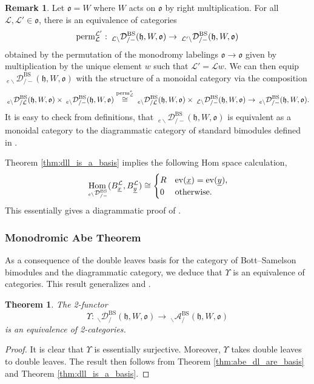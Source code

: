 \documentclass{amsart}
\newcommand{\scrL}{\mathcal{L}}
\DeclareMathOperator{\Hom}{Hom}
\newcommand{\fr}[1]{\mathfrak{#1}}
\DeclareMathOperator{\ev}{ev}
\DeclareMathOperator{\BS}{BS}
\newcommand{\EWmon}[2]{\:_{#1 \backslash} \mathcal{D}_{/ #2} }
\newcommand{\Amon}[2]{\:_{#1 \backslash} \mathcal{A}_{/ #2} }
\newcommand{\ux}{\underline{x}}
\newcommand{\uy}{\underline{y}}
\newtheorem{theorem}[subsubsection]{Theorem}
\theoremstyle{definition}
\newtheorem{remark}[subsubsection]{Remark}
\numberwithin{equation}{subsection}
\begin{document}
\begin{remark}
    Let $\fr{o} = W$ where $W$ acts on $\fr{o}$ by right multiplication.
    For all $\scrL, \scrL' \in \fr{o}$, there is an equivalence of categories
    \[\textnormal{perm}_{\scrL}^{\scrL'} : \EWmon{\scrL}{-}^{\BS} (\fr{h}, W, \fr{o}) \to \EWmon{\scrL'}{-}^{\BS} (\fr{h}, W, \fr{o})\]
    obtained by the permutation of the monodromy labelings $\fr{o} \to \fr{o}$ given by multiplication by the unique element $w$ such that $\scrL' = \scrL w$.
    We can then equip $\EWmon{e}{-}^{\BS} (\fr{h}, W, \fr{o})$ with the structure of a monoidal category via the composition
    \[\EWmon{e}{\scrL}^{\BS} (\fr{h}, W, \fr{o}) \times \EWmon{e}{-}^{\BS} (\fr{h}, W, \fr{o}) \stackrel{\textnormal{perm}_{\scrL}^{e}}{\cong} \EWmon{e}{\scrL}^{\BS} (\fr{h}, W, \fr{o}) \times \EWmon{\scrL}{-}^{\BS} (\fr{h}, W, \fr{o}) \to \EWmon{e}{-}^{\BS} (\fr{h}, W, \fr{o}).\]
    It is easy to check from definitions, that $\EWmon{e}{-}^{\BS} (\fr{h}, W, \fr{o})$ is equivalent as a monoidal category to the diagrammatic category of standard bimodules defined in \cite[\S 4.1]{EW}.

    Theorem \ref{thm:dll_is_a_basis} implies the following Hom space calculation,
    \[\Hom_{\EWmon{e}{-}^{\BS}} (B_{\ux}^{\scrL}, B_{\uy}^{\scrL}) \cong \begin{cases} R & \ev (\ux) = \ev (\uy), \\ 0 & \textnormal{otherwise}. \end{cases}\]
    This essentially gives a diagrammatic proof of \cite[Theorem 6.6]{EW0}.
\end{remark}

\subsubsection{Monodromic Abe Theorem}

As a consequence of the double leaves basis for the category of Bott--Samelson bimodules and the diagrammatic category, we deduce that $\Upsilon$ is an equivalence of categories.
This result generalizes \cite[Theorem 5.6]{Abe19} and \cite[Theorem 3.15]{Abe21}. 

\begin{theorem}\label{thm:mon_Abe}
    The 2-functor 
    \[ \Upsilon : \EWmon{}{}^{\BS} (\fr{h}, W, \fr{o}) \to \Amon{}{}^{\BS} (\fr{h}, W, \fr{o})\] 
    is an equivalence of 2-categories.
\end{theorem}
\begin{proof}
    It is clear that $\Upsilon$ is essentially surjective.
    Moreover, $\Upsilon$ takes double leaves to double leaves.
    The result then follows from Theorem \ref{thm:abe_dl_are_basis} and Theorem \ref{thm:dll_is_a_basis}.
\end{proof}
\end{document}
